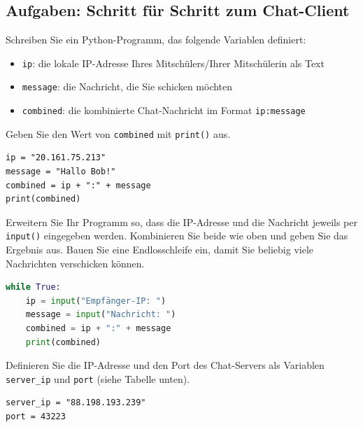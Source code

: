 \subsection{Aufgaben: Schritt für Schritt zum Chat-Client}

\begin{myexercise}
    Schreiben Sie ein Python-Programm, das folgende Variablen definiert:
    \begin{itemize}
        \item \texttt{ip}: die lokale IP-Adresse Ihres Mitschülers/Ihrer Mitschülerin als Text
        \item \texttt{message}: die Nachricht, die Sie schicken möchten
        \item \texttt{combined}: die kombinierte Chat-Nachricht im Format \texttt{ip:message}
    \end{itemize}
    Geben Sie den Wert von \texttt{combined} mit \texttt{print()} aus.
    \begin{myanswer}
        \begin{lstlisting}
ip = "20.161.75.213"
message = "Hallo Bob!"
combined = ip + ":" + message
print(combined)
\end{lstlisting}
    \end{myanswer}
\end{myexercise}

\begin{myexercise}

    Erweitern Sie Ihr Programm so, dass die IP-Adresse und die Nachricht jeweils per \texttt{input()} eingegeben werden. Kombinieren Sie beide wie oben und geben Sie das Ergebnis aus. Bauen Sie eine Endlosschleife ein, damit Sie beliebig viele Nachrichten verschicken können.
    \begin{myanswer}
        \begin{lstlisting}[language=Python]
while True:
    ip = input("Empfänger-IP: ")
    message = input("Nachricht: ")
    combined = ip + ":" + message
    print(combined)
\end{lstlisting}
    \end{myanswer}
\end{myexercise}

\begin{myexercise}
    Definieren Sie die IP-Adresse und den Port des Chat-Servers als Variablen \lstinline|server_ip| und \lstinline|port| (siehe Tabelle unten).
    \begin{myanswer}
        \begin{lstlisting}
server_ip = "88.198.193.239"
port = 43223
\end{lstlisting}
    \end{myanswer}
\end{myexercise}

